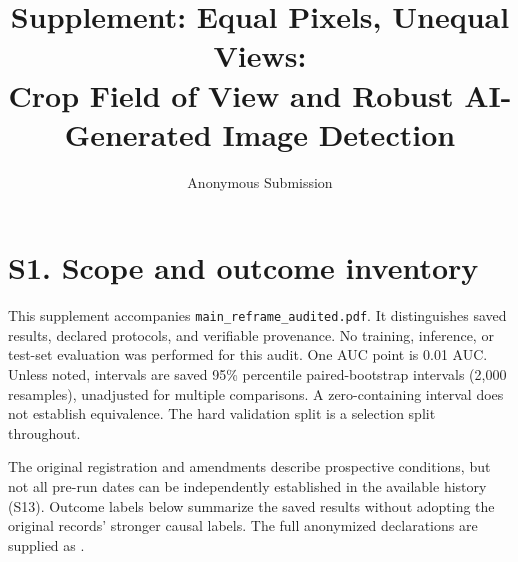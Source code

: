 \documentclass[letterpaper]{article}
\title{Supplement: Equal Pixels, Unequal Views:\\Crop Field of View and Robust AI-Generated Image Detection}
\author{Anonymous Submission}
\begin{document}
\maketitle

\section{S1. Scope and outcome inventory}

This supplement accompanies \texttt{main\_reframe\_audited.pdf}. It distinguishes saved results, declared protocols, and verifiable provenance. No training, inference, or test-set evaluation was performed for this audit. One AUC point is 0.01 AUC. Unless noted, intervals are saved 95\% percentile paired-bootstrap intervals (2,000 resamples), unadjusted for multiple comparisons. A zero-containing interval does not establish equivalence. The hard validation split is a selection split throughout.

The original registration and amendments describe prospective conditions, but not all pre-run dates can be independently established in the available history (S13). Outcome labels below summarize the saved results without adopting the original records' stronger causal labels. The full anonymized declarations are supplied as .
\end{document}
